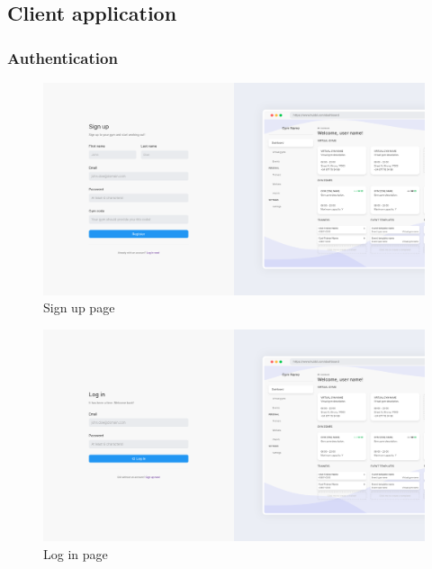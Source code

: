 \documentclass[a4paper, 12pt, oneside]{book}
\begin{document}
\subsection{Client application}
\subsubsection{Authentication}
\begin{figure}[H]
	\centering
	\includegraphics[width=\textwidth]{assets/client-screenshots/sign-up.png}
	\caption{Sign up page}
\end{figure}
\begin{figure}[H]
	\centering
	\includegraphics[width=\textwidth]{assets/client-screenshots/log-in.png}
	\caption{Log in page}
\end{figure}
\end{document}
